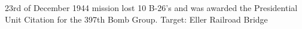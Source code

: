 \documentclass{article}
\begin{document}
\begin{multicols}{3}
23rd of December 1944 mission lost 10 B-26's and was awarded the 
Presidential Unit Citation for the 397th Bomb Group. Target: Eller 
Railroad Bridge

%
%
%
%
%
%
%
%

\end{multicols}
\end{document}
